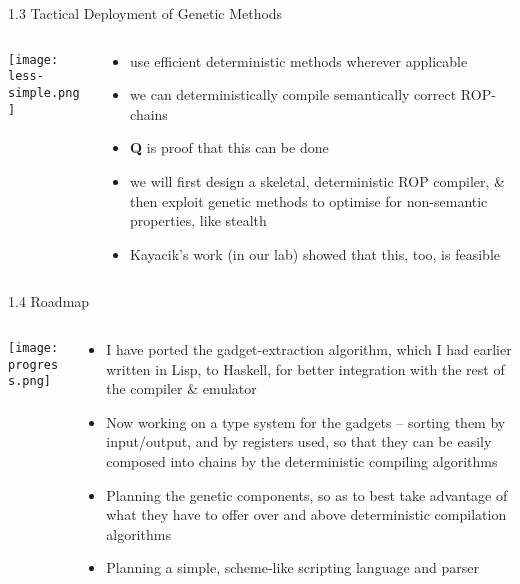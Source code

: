 \documentclass[9pt]{beamer}
\begin{document}
\begin{frame}{1.3 Tactical Deployment of Genetic Methods}

\begin{columns}

\begin{column}{0.5\textwidth}
\texttt{[image: less-simple.png]}

\end{column}
\begin{column}{.5\textwidth}

\begin{itemize}
\item use efficient deterministic methods wherever applicable
\item we can deterministically compile semantically correct ROP-chains 
\item \textbf{Q} is proof that this can be done
\item we will first design a skeletal, deterministic ROP compiler, \& then exploit genetic methods to optimise for non-semantic properties, like stealth
\item Kayacik's work (in our lab) showed that this, too, is feasible
\end{itemize}

\end{column}

\end{columns}

\end{frame}


\begin{frame}{1.4 Roadmap}
\begin{columns}

\begin{column}{.3\textwidth}
\begin{center}
\texttt{[image: progress.png]}
\end{center}
\end{column}

\begin{column}{.7\textwidth}
\begin{itemize}
\item I have ported the gadget-extraction algorithm, which I had earlier written in Lisp, to Haskell, for better integration with the rest of the compiler \& emulator
\item Now working on a type system for the gadgets -- sorting them by input/output, and by registers used, so that they can be easily composed into chains by the deterministic compiling algorithms
\item Planning the genetic components, so as to best take advantage of what they have to offer over and above deterministic compilation algorithms
\item Planning a simple, scheme-like scripting language and parser
\end{itemize}
\end{column}

\end{columns}
\end{frame}
\end{document}

